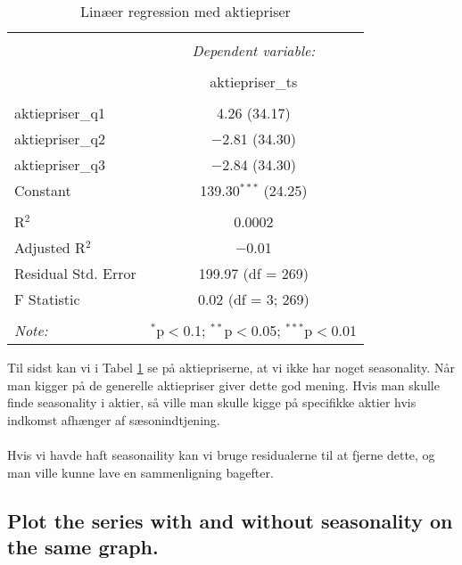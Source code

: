 \documentclass[
  10pt,
]{article}
\begin{document}
\begin{table}[!htbp] \centering 
  \caption{Linæer regression med aktiepriser} 
  \label{tab:tabel4} 
\begin{tabular}{@{\extracolsep{5pt}}lc} 
\\[-1.8ex]\hline 
\hline \\[-1.8ex] 
 & \multicolumn{1}{c}{\textit{Dependent variable:}} \\ 
\cline{2-2} 
\\[-1.8ex] & aktiepriser\_ts \\ 
\hline \\[-1.8ex] 
 aktiepriser\_q1 & 4.26 (34.17) \\ 
  aktiepriser\_q2 & $-$2.81 (34.30) \\ 
  aktiepriser\_q3 & $-$2.84 (34.30) \\ 
  Constant & 139.30$^{***}$ (24.25) \\ 
 \hline \\[-1.8ex] 
R$^{2}$ & 0.0002 \\ 
Adjusted R$^{2}$ & $-$0.01 \\ 
Residual Std. Error & 199.97 (df = 269) \\ 
F Statistic & 0.02 (df = 3; 269) \\ 
\hline 
\hline \\[-1.8ex] 
\textit{Note:}  & \multicolumn{1}{r}{$^{*}$p$<$0.1; $^{**}$p$<$0.05; $^{***}$p$<$0.01} \\ 
\end{tabular} 
\end{table}

Til sidst kan vi i Tabel \ref{tab:tabel4} se på aktiepriserne, at vi
ikke har noget seasonality. Når man kigger på de generelle aktiepriser
giver dette god mening. Hvis man skulle finde seasonality i aktier, så
ville man skulle kigge på specifikke aktier hvis indkomst afhænger af
sæsonindtjening.\\
~\\
Hvis vi havde haft seasonaility kan vi bruge residualerne til at fjerne
dette, og man ville kunne lave en sammenligning bagefter.

\newpage

\hypertarget{plot-the-series-with-and-without-seasonality-on-the-same-graph.}{%
\subsection{Plot the series with and without seasonality on the same
graph.}\label{plot-the-series-with-and-without-seasonality-on-the-same-graph.}}
\end{document}
